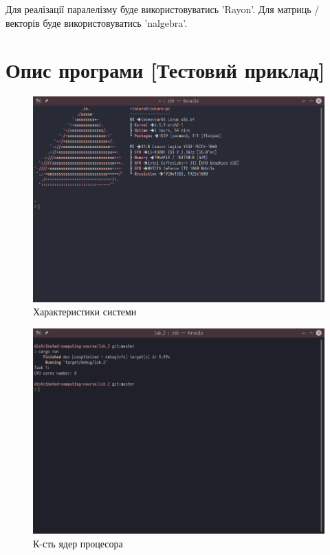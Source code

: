 \documentclass{udstu}
\begin{document}
Для реалізації паралелізму буде використовуватись 'Rayon'.
Для матриць / векторів буде використовуватись 'nalgebra'.

\chapter{Опис програми [Тестовий приклад]}
\label{chap:3}

\begin{figure}[!htp]
	\centering
	\includegraphics[scale=0.5]{PNG/system-specs.png}
	\caption{Характеристики системи}
	\label{fig:figure1}
\end{figure}

\begin{figure}[!htp]
	\centering
	\includegraphics[scale=0.5]{PNG/thread-num-test.png}
	\caption{К-сть ядер процесора}
	\label{fig:figure1}
\end{figure}
\end{document}
